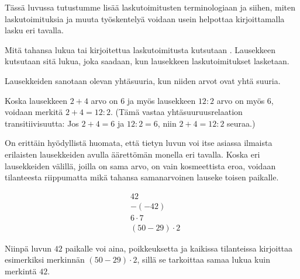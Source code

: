 Tässä luvussa tutustumme lisää laskutoimitusten terminologiaan ja siihen, miten laskutoimituksia ja muuta työskentelyä voidaan usein helpottaa kirjoittamalla lasku eri tavalla.

Mitä tahansa lukua tai kirjoitettua laskutoimitusta kutsutaan . Lausekkeen  kutsutaan sitä lukua, joka saadaan, kun lausekkeen laskutoimitukset lasketaan.

\begin{esimerkki}
\end{esimerkki}

Lausekkeiden sanotaan olevan yhtäsuuria, kun niiden arvot ovat yhtä suuria.

\begin{esimerkki}
Koska lausekkeen $2+4$ arvo on $6$ ja myös lausekkeen $12:2$ arvo on myös $6$, voidaan merkitä $2+4=12:2$. (Tämä vastaa yhtäsuuruusrelaation transitiivisuutta: Jos $2+4=6$ ja $12:2=6$, niin $2+4=12:2$ seuraa.)
\end{esimerkki}

On erittäin hyödyllistä huomata, että tietyn luvun voi itse asiassa ilmaista erilaisten lausekkeiden avulla äärettömän monella eri tavalla. Koska eri lausekkeiden välillä, joilla on sama arvo, on vain kosmeettista eroa, voidaan tilanteesta riippumatta mikä tahansa samanarvoinen lauseke  toisen paikalle.

\begin{esimerkki}
\begin{align*}
                &42 \\ &-(-42) \\ &6 \cdot 7 \\ &(50-29) \cdot 2
\end{align*}

Niinpä luvun $42$ paikalle voi aina, poikkeuksetta ja kaikissa tilanteissa kirjoittaa esimerkiksi merkinnän $(50-29)\cdot 2$, sillä se tarkoittaa samaa lukua kuin merkintä $42$.
\end{esimerkki}

